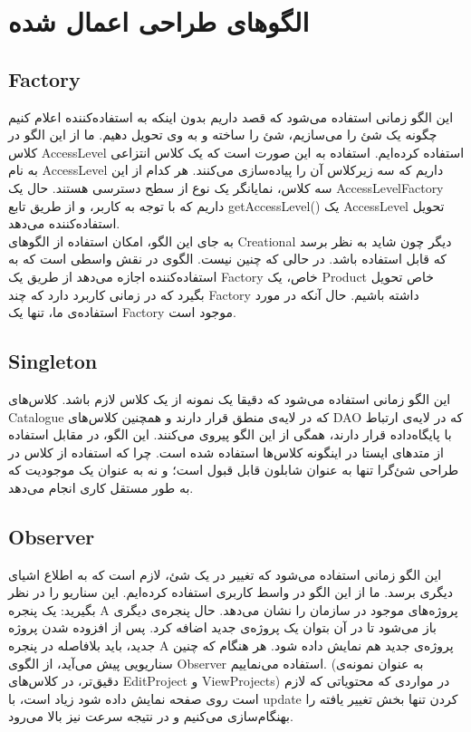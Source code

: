 
\chapter{الگوهای طراحی اعمال شده}

\section{Factory}
این الگو زمانی استفاده می‌شود که قصد داریم بدون اینکه به استفاده‌کننده اعلام کنیم چگونه یک شئ را می‌سازیم، شئ را ساخته و به وی تحویل دهیم. ما از این الگو در کلاس AccessLevel استفاده کرده‌ایم. استفاده به این صورت است که یک کلاس انتزاعی
 به نام AccessLevel داریم که سه زیرکلاس آن را پیاده‌سازی می‌کنند. هر کدام از این سه کلاس، نمایانگر یک نوع از سطح دسترسی هستند. حال یک AccessLevelFactory داریم که با توجه به کاربر،‌ و از طریق تابع getAccessLevel() یک AccessLevel تحویل استفاده‌کننده می‌دهد.\\
 به جای این الگو، امکان استفاده از الگوهای Creational دیگر چون 
 شاید به نظر برسد که قابل استفاده باشد. در حالی که چنین نیست. الگوی
 در نقش واسطی است که به استفاده‌کننده اجازه می‌دهد از طریق یک Factory خاص، یک Product خاص تحویل بگیرد که در زمانی کاربرد دارد که چند Factory داشته باشیم. حال آنکه در مورد استفاده‌ی ما، تنها یک Factory موجود است.


\section{Singleton}
این الگو زمانی استفاده می‌شود که دقیقا یک نمونه از یک کلاس لازم باشد. کلاس‌های Catalogue که در لایه‌ی منطق قرار دارند و همچنین کلاس‌های DAO که در لایه‌ی ارتباط با پایگاه‌داده قرار دارند، همگی از این الگو پیروی می‌کنند. این الگو، در مقابل استفاده از متد‌های ایستا در اینگونه کلاس‌ها استفاده شده است. چرا که استفاده از کلاس در طراحی شئ‌گرا تنها به عنوان شابلون قابل قبول است؛ و نه به عنوان یک موجودیت که به طور مستقل کاری انجام می‌دهد.


\section{Observer}
این الگو زمانی استفاده می‌شود که تغییر در یک شئ، لازم است که به اطلاع اشیای دیگری برسد. ما از این الگو در واسط کاربری استفاده کرده‌ایم. این سناریو را در نظر بگیرید: یک پنجره  A پروژه‌های موجود در سازمان را نشان می‌دهد. حال پنجره‌ی دیگری باز می‌شود تا در آن بتوان یک پروژه‌ی جدید اضافه کرد. پس از افزوده شدن پروژه جدید، باید بلافاصله در پنجره A پروژه‌ی جدید هم نمایش داده شود. هر هنگام که چنین سناریویی پیش می‌آید، از الگوی Observer استفاده می‌نماییم. (به عنوان نمونه‌ی دقیق‌تر، در کلاس‌های EditProject و ViewProjects) در مواردی که محتویاتی که لازم است روی صفحه نمایش داده شود زیاد است، با update کردن تنها بخش تغییر یافته را بهنگام‌سازی می‌کنیم و در نتیجه سرعت نیز بالا می‌رود.



